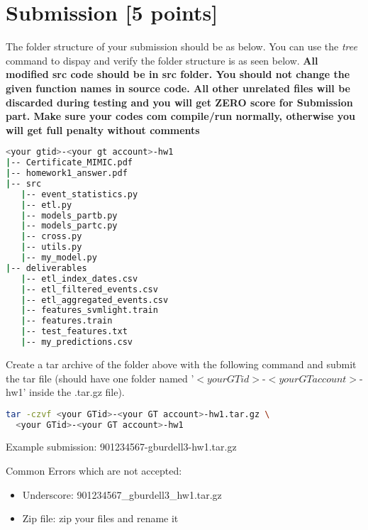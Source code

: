 \documentclass[12pt]{article}
\begin{document}

\section{Submission [5 points]}
The folder structure of your submission should be as below. You can use the \textit{tree} command to dispay and verify the folder structure is as seen below. \textbf{\color{red} All modified src code should be in src folder. You should not change the given function names in source code. All other unrelated files will be discarded during testing and you will get ZERO score for Submission part. Make sure your codes com compile/run normally, otherwise you will get full penalty without comments}
\begin{lstlisting}[language=bash,frame=single]
<your gtid>-<your gt account>-hw1
|-- Certificate_MIMIC.pdf
|-- homework1_answer.pdf
|-- src
   |-- event_statistics.py
   |-- etl.py
   |-- models_partb.py
   |-- models_partc.py
   |-- cross.py
   |-- utils.py
   |-- my_model.py
|-- deliverables
   |-- etl_index_dates.csv
   |-- etl_filtered_events.csv
   |-- etl_aggregated_events.csv
   |-- features_svmlight.train
   |-- features.train
   |-- test_features.txt
   |-- my_predictions.csv

\end{lstlisting}
Create a tar archive of the folder above with the following command and submit the tar file (should have one folder named '$<your GTid>$-$<your GT account>$-hw1' inside the .tar.gz file).
\begin{lstlisting}[language=bash,frame=single]
tar -czvf <your GTid>-<your GT account>-hw1.tar.gz \
  <your GTid>-<your GT account>-hw1
\end{lstlisting}
Example submission: 901234567-gburdell3-hw1.tar.gz
\newline

\noindent Common Errors which are not accepted:
\begin{itemize}
\item Underscore: 901234567\_gburdell3\_hw1.tar.gz   
\item Zip file: zip your files and rename it
\end{itemize}
\end{document}
